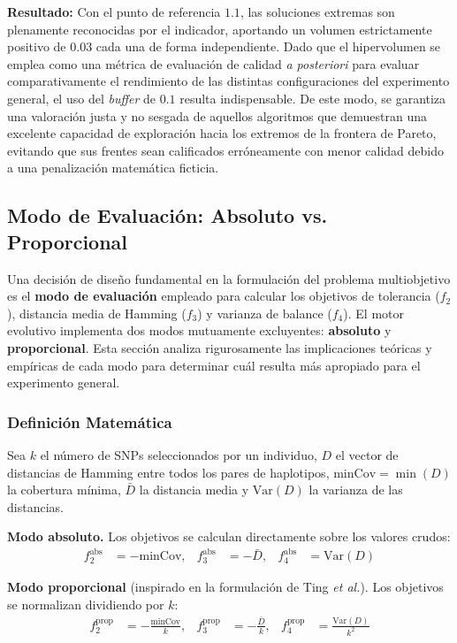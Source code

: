 \documentclass[a4paper,10pt]{article}
\begin{document}
\textbf{Resultado:} Con el punto de referencia $1.1$, las soluciones extremas son plenamente reconocidas por el indicador, aportando un volumen estrictamente positivo de $0.03$ cada una de forma independiente. Dado que el hipervolumen se emplea como una métrica de evaluación de calidad \textit{a posteriori} para evaluar comparativamente el rendimiento de las distintas configuraciones del experimento general, el uso del \textit{buffer} de $0.1$ resulta indispensable. De este modo, se garantiza una valoración justa y no sesgada de aquellos algoritmos que demuestran una excelente capacidad de exploración hacia los extremos de la frontera de Pareto, evitando que sus frentes sean calificados erróneamente con menor calidad debido a una penalización matemática ficticia.

\subsection{Modo de Evaluación: Absoluto vs. Proporcional}

Una decisión de diseño fundamental en la formulación del problema multiobjetivo es el \textbf{modo de evaluación} empleado para calcular los objetivos de tolerancia ($f_2$), distancia media de Hamming ($f_3$) y varianza de balance ($f_4$). El motor evolutivo implementa dos modos mutuamente excluyentes: \textbf{absoluto} y \textbf{proporcional}. Esta sección analiza rigurosamente las implicaciones teóricas y empíricas de cada modo para determinar cuál resulta más apropiado para el experimento general.

\subsubsection{Definición Matemática}

Sea $k$ el número de SNPs seleccionados por un individuo, $D$ el vector de distancias de Hamming entre todos los pares de haplotipos, $\text{minCov} = \min(D)$ la cobertura mínima, $\bar{D}$ la distancia media y $\text{Var}(D)$ la varianza de las distancias.

\textbf{Modo absoluto.} Los objetivos se calculan directamente sobre los valores crudos:
\begin{align}
    f_2^{\text{abs}} &= -\text{minCov}, &
    f_3^{\text{abs}} &= -\bar{D}, &
    f_4^{\text{abs}} &= \text{Var}(D)
\end{align}

\textbf{Modo proporcional} (inspirado en la formulación de Ting \textit{et al.}). Los objetivos se normalizan dividiendo por $k$:
\begin{align}
    f_2^{\text{prop}} &= -\frac{\text{minCov}}{k}, &
    f_3^{\text{prop}} &= -\frac{\bar{D}}{k}, &
    f_4^{\text{prop}} &= \frac{\text{Var}(D)}{k^2}
\end{align}
\end{document}
